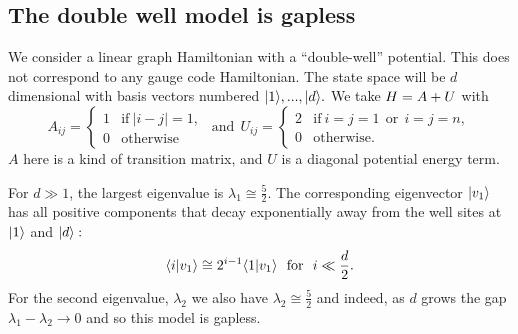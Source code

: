 \subsection{The double well model is gapless}

We consider a linear graph Hamiltonian
with a ``double-well'' potential.
This does not correspond to any gauge code Hamiltonian.
The state space will be $d$ dimensional with
basis vectors numbered $|{1}\rangle,...,|{d}\rangle.$
We take
$ H = A + U $
with
$$
A_{ij} = \left\{ \begin{array}{ll}
     1 &\mbox{if}\  |i-j|=1,  \\
     0 &\mbox{otherwise}\end{array}\right.
\ \ \mbox{and}\ \ 
U_{ij} =  \left\{ \begin{array}{ll}
     2 &\mbox{if}\  i=j=1 \ \ \mbox{or}\ \  i=j=n, \\
     0 &\mbox{otherwise.}\end{array}\right.
$$
$A$ here is a kind of transition matrix,
and $U$ is a diagonal potential energy term.

For $d\gg 1$, the largest
eigenvalue is $\lambda_1 \cong \frac{5}{2}$.
The corresponding eigenvector $|{v_1}\rangle$
has all positive components that
decay exponentially away from the well sites
at $|{1}\rangle$ and $|{d}\rangle:$
$$
    \langle{i}|{v_1}\rangle 
    \cong 2^{i-1} \langle{1}|{v_1}\rangle
    \ \ \mbox{for}\ \ i\ll \frac{d}{2}.
$$
For the second eigenvalue, $\lambda_2$
we also have  $\lambda_2 \cong \frac{5}{2}$
and indeed, as $d$ grows
the gap $\lambda_1 - \lambda_2 \rightarrow 0$
and so this model is gapless.

